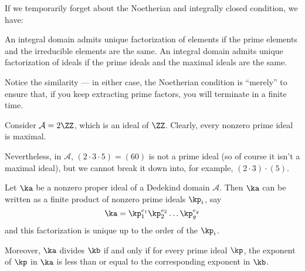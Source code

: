 \begin{remark}
	If we temporarily forget about the Noetherian and integrally closed condition, we have:
	\begin{itemize}
		\ii An integral domain admits unique factorization of elements if the prime elements and the irreducible elements are the same.
		\ii An integral domain admits unique factorization of ideals if the prime ideals and the maximal ideals are the same.
	\end{itemize}
	Notice the similarity --- in either case, the Noetherian condition is ``merely'' to ensure that, if you keep extracting prime factors, you will terminate in a finite time.
\end{remark}

\begin{example}
	Consider $\mathcal A = 2\ZZ$, which is an ideal of $\ZZ$.
	Clearly, every nonzero prime ideal is maximal.

	Nevertheless, in $\mathcal A$,
	$(2 \cdot 3 \cdot 5)=(60)$ is not a prime ideal (so of course it isn't a maximal ideal),
	but we cannot break it down into, for example, $(2 \cdot 3) \cdot (5)$.
\end{example}

\begin{theorem}
	Let $\ka$ be a nonzero proper ideal of a Dedekind domain $\mathcal A$.
	Then $\ka$ can be written as a finite product of nonzero prime ideals $\kp_i$, say
	\[ \ka = \kp_1^{e_1} \kp_2^{e_2} \dots \kp_g^{e_g} \]
	and this factorization is unique up to the order of the $\kp_i$.

	Moreover, $\ka$ divides $\kb$ if and only if for every prime ideal $\kp$,
	the exponent of $\kp$ in $\ka$ is less than or equal to the corresponding exponent in $\kb$.
\end{theorem}

